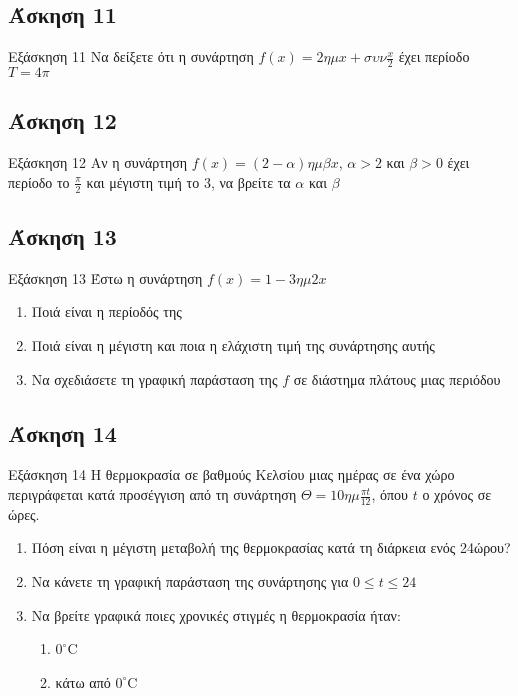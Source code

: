 \documentclass[greek]{beamer}
\begin{document}
\subsection{Άσκηση 11}
\begin{frame}[label=Άσκηση11]{Εξάσκηση 11}
 Να δείξετε ότι η συνάρτηση $f(x)=2ημx+συν\frac{x}{2}$ έχει περίοδο $T=4π$

\end{frame}

\subsection{Άσκηση 12}
\begin{frame}[label=Άσκηση12]{Εξάσκηση 12}
 Αν η συνάρτηση $f(x)=(2-α)ημβx$, $α>2$ και $β>0$ έχει περίοδο το $\frac{π}{2}$ και μέγιστη τιμή το $3$, να βρείτε τα $α$ και $β$

\end{frame}

\subsection{Άσκηση 13}
\begin{frame}[label=Άσκηση13]{Εξάσκηση 13}
 Έστω η συνάρτηση $f(x)=1-3ημ2x$
 \begin{enumerate}
  \item<1-> Ποιά είναι η περίοδός της
  \item<2-> Ποιά είναι η μέγιστη και ποια η ελάχιστη τιμή της συνάρτησης αυτής
  \item<3-> Να σχεδιάσετε τη γραφική παράσταση της $f$ σε διάστημα πλάτους μιας περιόδου
 \end{enumerate}

\end{frame}

\subsection{Άσκηση 14}
\begin{frame}[label=Άσκηση14]{Εξάσκηση 14}
 Η θερμοκρασία σε βαθμούς Κελσίου μιας ημέρας σε ένα χώρο περιγράφεται κατά προσέγγιση από τη συνάρτηση $Θ=10ημ\frac{πt}{12}$, όπου $t$ ο χρόνος σε ώρες.
 \begin{enumerate}
  \item<1-> Πόση είναι η μέγιστη μεταβολή της θερμοκρασίας κατά τη διάρκεια ενός 24ώρου?
  \item<2-> Να κάνετε τη γραφική παράσταση της συνάρτησης για $0\le t \le 24$
  \item<3-> Να βρείτε γραφικά ποιες χρονικές στιγμές η θερμοκρασία ήταν:
   \begin{enumerate}
    \item<3-> $0^{\circ}$C
    \item<4-> κάτω από $0^{\circ}$C
   \end{enumerate}
 \end{enumerate}

\end{frame}
\end{document}
